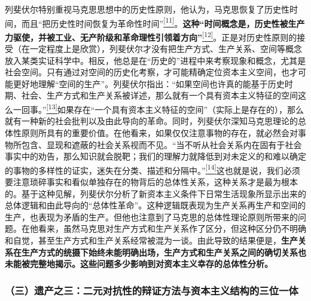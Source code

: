 \documentclass[UTF8, fontset = sourcesans, a4paper, oneside, zihao =
-4, scheme=chinese, no-math, space=true]{ctexbook}
\begin{document}
列斐伏尔特别重视马克思思想中的历史性原则，他认为，马克思恢复了历史性时间，而且``把历史性时间恢复为革命性时间''\protect\hypertarget{part0007_split_001.htmlux5cux23w11}{}{}\protect\hyperlink{part0007_split_004.htmlux5cux23m11}{\textsuperscript{{[}11{]}}}。\textbf{这种``时间概念是，历史性被生产力驱使，并被工业、无产阶级和革命理性引领着方向''}\protect\hypertarget{part0007_split_001.htmlux5cux23w12}{}{}\protect\hyperlink{part0007_split_004.htmlux5cux23m12}{\textsuperscript{{[}12{]}}}。正是对历史性原则的接受（在一定程度上是欣赏），列斐伏尔才没有把生产方式、生产关系、空间等概念放入某类实证科学中。相反，他总是在``历史的''进程中来考察现象和概念，尤其是社会空间。只有通过对空间的历史化考察，才可能精确定位资本主义空间，也才可能更好地理解``空间的生产''。列斐伏尔指出：``如果空间也许真的能基于历史时期、社会、生产方式和生产关系被详述，那么就有一个具有资本主义特征的空间这么一回事。''\protect\hypertarget{part0007_split_001.htmlux5cux23w13}{}{}\protect\hyperlink{part0007_split_004.htmlux5cux23m13}{\textsuperscript{{[}13{]}}}如果存在``一个具有资本主义特征的空间''（实际上是存在的），那么就有一种新的社会批判以及由此导向的革命。同时，列斐伏尔深知马克思理论的总体性原则所具有的重要价值。在他看来，如果仅仅注意事物的存在，就必然会对事物所包含、显现和遮蔽的社会关系视而不见。``当不听从社会关系内在固有于社会事实中的劝告，那么知识就会脱靶；我们的理解力就降低到对未定义的和难以确定的事物的多样性的证实，迷失在分类、描述和分隔中。''\protect\hypertarget{part0007_split_001.htmlux5cux23w14}{}{}\protect\hyperlink{part0007_split_004.htmlux5cux23m14}{\textsuperscript{{[}14{]}}}这也就是说，我们必须要注意琐碎事实和看似单独存在的物背后的总体性关系，这种关系才是最为根本的。基于这种见解，列斐伏尔分析了新资本主义条件下日常生活现象所显示出来的总体逻辑和由此导向的``总体性革命''。这种逻辑既表现为生产关系再生产和空间的生产，也表现为矛盾的生产。但他也注意到了马克思的总体性理论原则所带来的问题。在他看来，虽然马克思对生产方式和生产关系作了区分，但这种区分仍不明确和自觉，甚至生产方式和生产关系经常被混为一谈。由此导致的结果便是，\textbf{生产关系在生产方式的统摄下始终未能明确出场，生产方式和生产关系之间的确切关系也未能被完整地揭示。这些问题多少影响到对资本主义幸存的总体性分析。}

\subsubsection{（三）遗产之三：二元对抗性的辩证方法与资本主义结构的三位一体}\label{part0007_split_001.htmlux5cux23d010}
\end{document}
